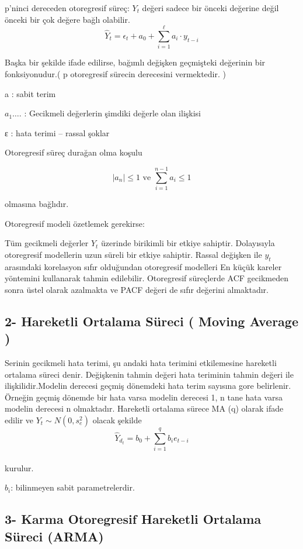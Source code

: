 \documentclass[11pt]{article}
\begin{document}
p'ninci dereceden otoregresif süreç: \(Y_{t}\) değeri sadece bir önceki
değerine değil önceki bir çok değere bağlı olabilir.
\[ \hat Y_{t} = ϵ_{t}+a_{0}+ \sum_{i=1}^\ell a_{i}\cdot y_{t-i}  \]

Başka bir şekilde ifade edilirse, bağımlı değişken geçmişteki değerinin
bir fonksiyonudur.( p otoregresif sürecin derecesini vermektedir. )

a : sabit terim

\(a_{1} ….\) : Gecikmeli değerlerin şimdiki değerle olan ilişkisi

ε : hata terimi -- rassal şoklar

Otoregresif süreç durağan olma koşulu

\[ |a_n|\leq 1 \text{ ve } \sum_{i=1}^{n-1} a_i \leq 1 \]

olmasına bağlıdır.

Otoregresif modeli özetlemek gerekirse:

Tüm gecikmeli değerler \(Y_t\) üzerinde birikimli bir etkiye sahiptir.
Dolayısıyla otoregresif modellerin uzun süreli bir etkiye sahiptir.
Rassal değişken ile \(y_{t}\) arasındaki korelasyon sıfır olduğundan
otoregresif modelleri En küçük kareler yöntemini kullanarak tahmin
edilebilir. Otoregresif süreçlerde ACF gecikmeden sonra üstel olarak
azalmakta ve PACF değeri de sıfır değerini almaktadır.

\subsection{2- Hareketli Ortalama Süreci ( Moving Average
)}\label{hareketli-ortalama-suxfcreci-moving-average}

Serinin gecikmeli hata terimi, şu andaki hata terimini etkilemesine
hareketli ortalama süreci denir. Değişkenin tahmin değeri hata teriminin
tahmin değeri ile ilişkilidir.Modelin derecesi geçmiş dönemdeki hata
terim sayısına gore belirlenir. Örneğin geçmiş dönemde bir hata varsa
modelin derecesi 1, n tane hata varsa modelin derecesi n olmaktadır.
Hareketli ortalama sürece MA (q) olarak ifade edilir ve
\(Y_{t}\sim N(0,s^2_{e})\) olacak şekilde
\[ \hat Y_{d_t} = b_{0} + \sum_{i=1}^q b_i e_{t-i}  \]\\
kurulur.

\(b_{i}\): bilinmeyen sabit parametrelerdir.

\subsection{3- Karma Otoregresif Hareketli Ortalama Süreci
(ARMA)}\label{karma-otoregresif-hareketli-ortalama-suxfcreci-arma}
\end{document}
